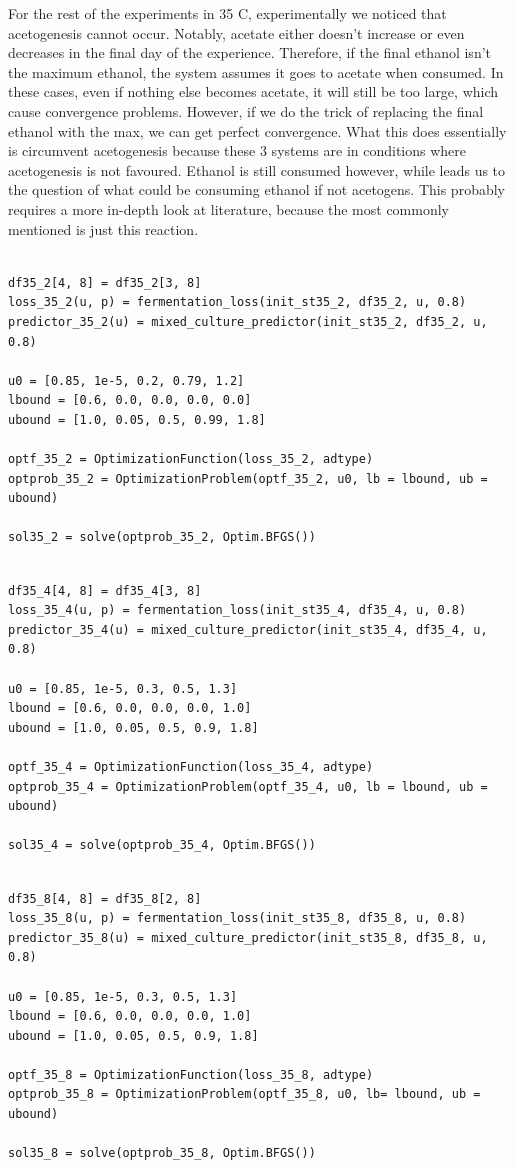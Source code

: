 \documentclass[11pt]{article}
\begin{document}
For the rest of the experiments in 35 C, experimentally we noticed that acetogenesis cannot occur. Notably, acetate either doesn't increase or even decreases in the final day of the experience. Therefore, if the final ethanol isn't the maximum ethanol, the system assumes it goes to acetate when consumed. In these cases, even if nothing else becomes acetate, it will still be too large, which cause convergence problems. However, if we do the trick of replacing the final ethanol with the max, we can get perfect convergence. What this does essentially is circumvent acetogenesis because these 3 systems are in conditions where acetogenesis is not favoured. Ethanol is still consumed however, while leads us to the question of what could be consuming ethanol if not acetogens. This probably requires a more in-depth look at literature, because the most commonly mentioned is just this reaction.

\begin{verbatim}

df35_2[4, 8] = df35_2[3, 8]
loss_35_2(u, p) = fermentation_loss(init_st35_2, df35_2, u, 0.8)
predictor_35_2(u) = mixed_culture_predictor(init_st35_2, df35_2, u, 0.8)

u0 = [0.85, 1e-5, 0.2, 0.79, 1.2]
lbound = [0.6, 0.0, 0.0, 0.0, 0.0]
ubound = [1.0, 0.05, 0.5, 0.99, 1.8]

optf_35_2 = OptimizationFunction(loss_35_2, adtype)
optprob_35_2 = OptimizationProblem(optf_35_2, u0, lb = lbound, ub = ubound)

sol35_2 = solve(optprob_35_2, Optim.BFGS())
\end{verbatim}

\begin{verbatim}

df35_4[4, 8] = df35_4[3, 8]
loss_35_4(u, p) = fermentation_loss(init_st35_4, df35_4, u, 0.8)
predictor_35_4(u) = mixed_culture_predictor(init_st35_4, df35_4, u, 0.8)

u0 = [0.85, 1e-5, 0.3, 0.5, 1.3]
lbound = [0.6, 0.0, 0.0, 0.0, 1.0]
ubound = [1.0, 0.05, 0.5, 0.9, 1.8]

optf_35_4 = OptimizationFunction(loss_35_4, adtype)
optprob_35_4 = OptimizationProblem(optf_35_4, u0, lb = lbound, ub = ubound)

sol35_4 = solve(optprob_35_4, Optim.BFGS())
\end{verbatim}

\begin{verbatim}

df35_8[4, 8] = df35_8[2, 8]
loss_35_8(u, p) = fermentation_loss(init_st35_8, df35_8, u, 0.8)
predictor_35_8(u) = mixed_culture_predictor(init_st35_8, df35_8, u, 0.8)

u0 = [0.85, 1e-5, 0.3, 0.5, 1.3]
lbound = [0.6, 0.0, 0.0, 0.0, 1.0]
ubound = [1.0, 0.05, 0.5, 0.9, 1.8]

optf_35_8 = OptimizationFunction(loss_35_8, adtype)
optprob_35_8 = OptimizationProblem(optf_35_8, u0, lb= lbound, ub = ubound)

sol35_8 = solve(optprob_35_8, Optim.BFGS())
\end{verbatim}
\end{document}
